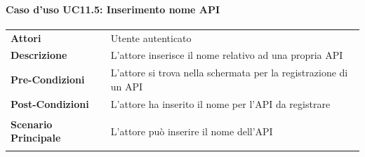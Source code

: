 \paragraph{Caso d'uso UC11.5: Inserimento nome API}
\label{UC11_5}

\begin{minipage}{\linewidth}
	\begin{tabular}{ l | p{11cm}}
		\hline
		\rowcolor{Gray}
		\multicolumn{2}{c}{UC11.5 - Inserimento nome API} \\
		\hline
		\textbf{Attori} & Utente autenticato \\
		\textbf{Descrizione} & L'attore inserisce il nome relativo ad una propria API\\
		\textbf{Pre-Condizioni} & L'attore si trova nella schermata per la registrazione di un API\\
		\textbf{Post-Condizioni} & L'attore ha inserito il nome per l'API da registrare \\
		\textbf{Scenario Principale} & 
		\begin{enumerate*}[label=(\arabic*.),itemjoin={\newline}]
			\item L'attore può inserire il nome dell'API
		\end{enumerate*}\\
	\end{tabular}
\end{minipage}